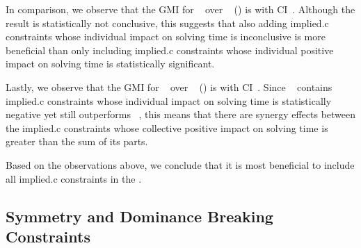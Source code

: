 In comparison, we observe that the \gls{GMI} for ~ over ~
() is \printGMI{%
  \SolvTechDisableBadImpliedConsPrePlusSolvingTimeSpeedupPrePlusSolvingTimeRegularSpeedupGmean%
} with \gls{CI}~\printGMICI{%
  \SolvTechDisableBadImpliedConsPrePlusSolvingTimeSpeedupPrePlusSolvingTimeRegularSpeedupCiMin%
}{%
  \SolvTechDisableBadImpliedConsPrePlusSolvingTimeSpeedupPrePlusSolvingTimeRegularSpeedupCiMax%
}.
%
Although the result is statistically not conclusive, this suggests that also
adding \gls{implied.c} \glspl{constraint} whose individual impact on solving
time is inconclusive is more beneficial than only including \gls{implied.c}
\glspl{constraint} whose individual positive impact on solving time is
statistically significant.

Lastly, we observe that the \gls{GMI} for ~ over ~
() is \printGMI{%
  \SolvTechDisableAllImpliedConsPrePlusSolvingTimeSpeedupPrePlusSolvingTimeRegularSpeedupGmean%
} with \gls{CI}~\printGMICI{%
  \SolvTechDisableAllImpliedConsPrePlusSolvingTimeSpeedupPrePlusSolvingTimeRegularSpeedupCiMin%
}{%
  \SolvTechDisableAllImpliedConsPrePlusSolvingTimeSpeedupPrePlusSolvingTimeRegularSpeedupCiMax%
}.
%
Since ~ contains
\gls{implied.c} \glspl{constraint} whose individual impact on solving time is
statistically negative yet still outperforms ~, this means that there are synergy
effects between the \gls{implied.c} \glspl{constraint} whose collective positive
impact on solving time is greater than the sum of its parts.

Based on the observations above, we conclude that it is most beneficial to
include all \gls{implied.c} \glspl{constraint} in the .


\subsection{Symmetry and Dominance Breaking Constraints}

\def\modelA{\textsc{i}}
\def\modelB{\textsc{ii}}

